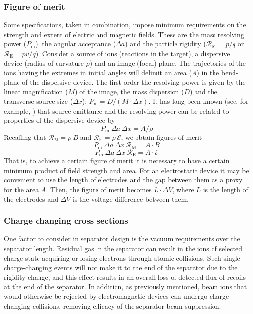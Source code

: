   \subsubsection{Figure of merit}
  Some specifications, taken in combination, impose minimum requirements on the strength and extent of electric and magnetic fields.   These are the mass resolving power ($P_\mathrm{m}$), the angular acceptance ($\Delta a$) and the particle rigidity 
  ($\mathcal{R}_\mathrm{M}=p/q$ or $\mathcal{R}_\mathrm{E}=pv/q$).    
  Consider a source of ions (reactions in the target), a dispersive device  (radius of curvature $\rho$) and an image (focal) plane.   The  trajectories of the ions having the extremes in initial angles will delimit an area ($A$)  in the bend-plane of the dispersive device.     The first order the resolving power is given by the linear magnification ($M$) of the image, the mass dispersion ($D$) and the transverse source size ($\Delta x$): 
  $P_\mathrm{m} = D/(M \cdot \Delta x) $. 
  It has long been known (see, for example, \cite{Wo71}) that source emittance and the resolving power can be related to properties of the dispersive device by
  \[ P_\mathrm{m}\  \Delta a\  \Delta x = A/\rho \]
  Recalling that 
  $\mathcal{R}_\mathrm{M}=\rho \ B$ and $\mathcal{R}_\mathrm{E}=\rho \ \mathcal{E}$,  we obtain  figures of merit 
  \[ P_\mathrm{m}\  \Delta a\  \Delta x \ \mathcal{R}_\mathrm{M} = A \cdot B \]
   \[P_\mathrm{m}\  \Delta a\  \Delta x \ \mathcal{R}_\mathrm{E} = A \cdot \mathcal{E} \]
   That is, to achieve a certain figure of merit it is necessary to have a certain minimum product of field strength and area.  For an electrostatic device it may be convenient to use the length of electrodes and the gap between them as a proxy for the area $A$.  Then, the figure of merit becomes $L\cdot\Delta V$, where $L$ is the length of the electrodes and $\Delta V$ is the voltage difference between them.
   
\subsubsection{Charge changing cross sections}
One factor to consider in separator design is the vacuum requirements over the separator length. Residual gas in the separator can result in the ions of selected charge state acquiring or losing electrons through atomic collisions. Such single charge-changing events will not make it to the end of the separator due to the rigidity change, and this effect results in an overall loss of detected flux of recoils at the end of the separator.  In addition, as previously mentioned, beam ions that would otherwise be rejected by electromagnetic devices can undergo charge-changing collisions, removing efficacy of the separator beam suppression.

